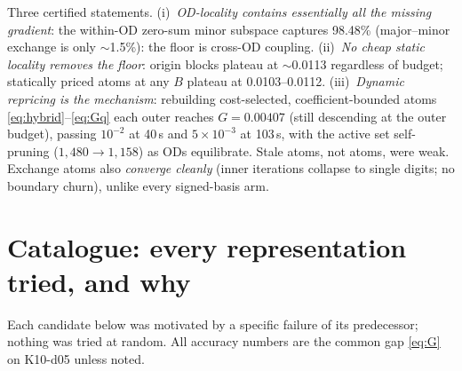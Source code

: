 \documentclass[11pt]{article}
\begin{document}
\noindent Three certified statements. (i)~\emph{OD-locality contains essentially all the
missing gradient}: the within-OD zero-sum minor subspace captures 98.48\% (major--minor
exchange is only $\sim$1.5\%): the floor is cross-OD coupling. (ii)~\emph{No cheap static
locality removes the floor}: origin blocks plateau at $\sim$0.0113 regardless of budget;
statically priced atoms at any $B$ plateau at 0.0103--0.0112. (iii)~\emph{Dynamic
repricing is the mechanism}: rebuilding cost-selected, coefficient-bounded atoms
\eqref{eq:hybrid}--\eqref{eq:Gq} each outer reaches $G=0.00407$ (still descending at the
outer budget), passing $10^{-2}$ at 40\,s and $5\times10^{-3}$ at 103\,s, with the active
set self-pruning ($1{,}480\to1{,}158$) as ODs equilibrate. Stale atoms, not atoms, were
weak. Exchange atoms also \emph{converge cleanly} (inner iterations collapse to single
digits; no boundary churn), unlike every signed-basis arm.

\section{Catalogue: every representation tried, and why}\label{sec:catalogue}

Each candidate below was motivated by a specific failure of its predecessor; nothing was
tried at random. All accuracy numbers are the common gap \eqref{eq:G} on K10-d05 unless
noted.
\end{document}

